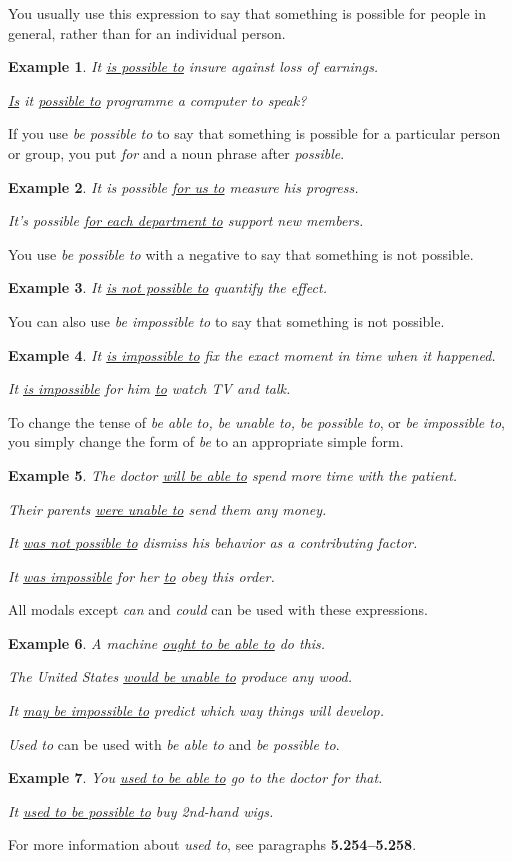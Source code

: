 \documentclass[oneside]{book}
\numberwithin{equation}{section}
\newtheorem{example}{Example}[section]
\begin{document}
You usually use this expression to say that something is possible for people in general, rather than for an individual person.
\begin{example}
    It \underline{is possible to} insure against loss of earnings.
    
    \underline{Is} it \underline{possible to} programme a computer to speak?
\end{example}
If you use \textit{be possible to} to say that something is possible for a particular person or group, you put \textit{for} and a noun phrase after \textit{possible}.
\begin{example}
    It is possible \underline{for us to} measure his progress.
    
    It's possible \underline{for each department to} support new members.
\end{example}
You use \textit{be possible to} with a negative to say that something is not possible.
\begin{example}
    It \underline{is not possible to} quantify the effect.
\end{example}
%
\noindent{} You can also use \textit{be impossible to} to say that something is not possible.
\begin{example}
    It \underline{is impossible to} fix the exact moment in time when it happened.
    
    It \underline{is impossible} for him \underline{to} watch TV and talk.
\end{example}
%
\noindent{} To change the tense of \textit{be able to, be unable to, be possible to}, or \textit{be impossible to}, you simply change the form of \textit{be} to an appropriate simple form.
\begin{example}
    The doctor \underline{will be able to} spend more time with the patient.
    
    Their parents \underline{were unable to} send them any money.
    
    It \underline{was not possible to} dismiss his behavior as a contributing factor.
    
    It \underline{was impossible} for her \underline{to} obey this order.
\end{example}
%
\noindent{} All modals except \textit{can} and \textit{could} can be used with these expressions.
\begin{example}
    A machine \underline{ought to be able to} do this.
    
    The United States \underline{would be unable to} produce any wood.
    
    It \underline{may be impossible to} predict which way things will develop.
\end{example}
%
\noindent{} \textit{Used to} can be used with \textit{be able to} and \textit{be possible to}.
\begin{example}
    You \underline{used to be able to} go to the doctor for that.
    
    It \underline{used to be possible to} buy 2nd-hand wigs.
\end{example}
For more information about \textit{used to}, see paragraphs \textbf{5.254--5.258}.
\end{document}
